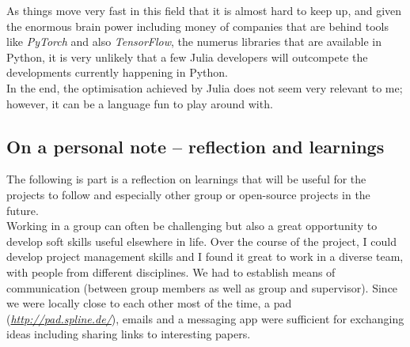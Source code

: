 \documentclass[journal, a4paper]{IEEEtran}
\begin{document}
As things move very fast in this field that it is almost hard to keep up, and given the enormous brain power including money of companies that are behind tools like \textit{PyTorch} and also \textit{TensorFlow}, the numerus libraries that are available in Python, it is very unlikely that a few Julia developers will outcompete the developments currently happening in Python. \\

In the end, the optimisation achieved by Julia does not seem very relevant to me; however, it can be a language fun to play around with.




\subsection{\textbf{On a personal note -- reflection and learnings}}



The following is part is a reflection on learnings that will be useful for the projects to follow and especially other group or open-source projects in the future.\\


Working in a group can often be challenging but also a great opportunity to develop soft skills useful elsewhere in life. Over the course of the project, I could develop project management skills and I found it great to work in a diverse team, with people from different disciplines. 
We had to establish means of communication (between group members as well as group and supervisor). Since we were locally close to each other most of the time, a pad (\textit{\url{http://pad.spline.de/}}), emails and a messaging app were sufficient for exchanging ideas including sharing links to interesting papers.
\end{document}
